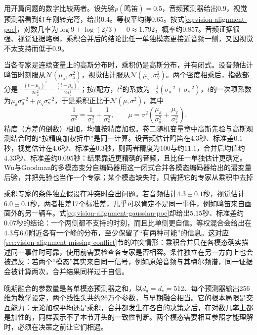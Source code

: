 用开篇问题的数字比较两者。设先验$p(\text{鸣笛})=0.5$，音频预测器给出$0.9$，视觉预测器看到红车刚转完弯，给出$0.4$。等权平均得$0.65$。按式\eqref{eq:vision-alignment-poe}，对数几率为$\log 9+\log(2/3)-0\approx1.792$，概率约$0.857$。音频证据很强、视觉证据略弱，乘积合并后的结论比任一单独模态更接近音频一侧，又因视觉不太支持而低于$0.9$。

当各专家是连续变量上的高斯分布时，乘积仍是高斯分布，并有闭式。设音频估计鸣笛时刻服从$\mathcal N(\mu_{\mathrm a},\sigma_{\mathrm a}^2)$，视觉估计服从$\mathcal N(\mu_{\mathrm v},\sigma_{\mathrm v}^2)$。两个密度相乘后，指数部分是$-\frac{(t-\mu_{\mathrm a})^2}{2\sigma_{\mathrm a}^2}-\frac{(t-\mu_{\mathrm v})^2}{2\sigma_{\mathrm v}^2}$；按$t$配方，$t^2$的系数为$-\frac12(\sigma_{\mathrm a}^{-2}+\sigma_{\mathrm v}^{-2})$，$t$的一次项系数为$\mu_{\mathrm a}\sigma_{\mathrm a}^{-2}+\mu_{\mathrm v}\sigma_{\mathrm v}^{-2}$，于是乘积正比于$\mathcal N(\mu,\sigma^2)$，其中
\begin{equation}
  \frac{1}{\sigma^2}=\frac{1}{\sigma_{\mathrm a}^2}+\frac{1}{\sigma_{\mathrm v}^2},\qquad
  \mu=\sigma^2\left(\frac{\mu_{\mathrm a}}{\sigma_{\mathrm a}^2}+\frac{\mu_{\mathrm v}}{\sigma_{\mathrm v}^2}\right).
  \label{eq:vision-alignment-gaussian-poe}
\end{equation}
精度（方差的倒数）相加，均值按精度加权。卷二随机变量章中高斯先验与高斯观测结合时的“按精度加权折中”是同一计算。设音频估计鸣笛在$4.3$秒、标准差$0.1$秒，视觉估计在$4.6$秒、标准差$0.3$秒，则两者精度为$100$与约$11.1$，合并后均值约$4.33$秒、标准差约$0.095$秒：结果靠近更精确的音频，且比任一单独估计更确定。Wu与Goodman的多模态变分自编码器用这一闭式合并各模态编码器给出的潜变量后验，并把先验也当作一个专家；某个模态缺失时，只需把它的专家从乘积中去掉

乘积专家的条件独立假设在冲突时会出问题。若音频估计$4.3\pm0.1$秒，视觉估计$6.0\pm0.1$秒，两者相差17个标准差，几乎可以肯定不是同一事件，例如鸣笛来自画面外的另一辆车。式\eqref{eq:vision-alignment-gaussian-poe}却给出$5.15$秒、标准差约$0.07$秒的结论：一个两侧都不支持的时刻，而且比单侧更自信。等权混合会给出在$4.3$与$6.0$附近各有一个峰的分布，至少保留了“有两种可能”的信息。这对应\ref{sec:vision-alignment-missing-conflict}节的冲突情形：乘积合并只在各模态确实描述同一事件时可靠，使用前需要检查各专家是否相容。条件独立在另一方向上也会被违反：若两个“模态”其实来自同一信号，例如原始音频与其梅尔频谱，同一证据会被计算两次，合并结果同样过于自信。

晚期融合的参数量是各单模态预测器之和，以$d_{\mathrm a}=d_{\mathrm v}=512$、每个预测器输出256维为教学设定，两个线性头共约26万个参数，与早期融合相当。它的根本局限是交互能力：无论加权平均还是乘积，合并都发生在各自的决策之后，在对数几率上都是加性的，同样表示不了本节开头的一致性判断。两个模态需要相互参照才能理解时，必须在决策之前让它们相遇。

